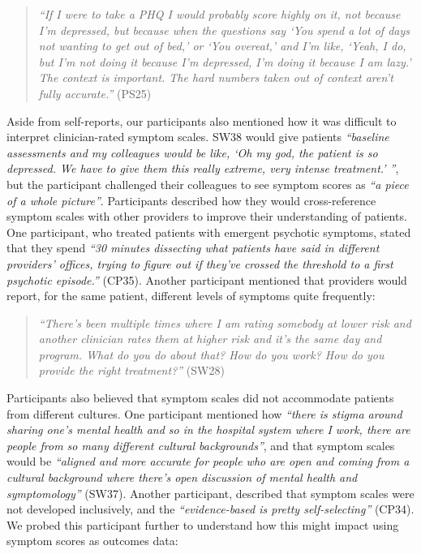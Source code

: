 \begin{quote}
    \textit{``If I were to take a PHQ I would probably score highly on it, not because I'm depressed, but because when the questions say `You spend a lot of days not wanting to get out of bed,' or `You overeat,' and I'm like, `Yeah, I do, but I'm not doing it because I'm depressed, I'm doing it because I am lazy.' 
    The context is important.
    The hard numbers taken out of context aren't fully accurate.''} (PS25)
\end{quote}

Aside from self-reports, our participants also mentioned how it was difficult to interpret clinician-rated symptom scales.
SW38 would give patients \textit{``baseline assessments and my colleagues would be like, `Oh my god, the patient is so depressed. We have to give them this really extreme, very intense treatment.' ''}, but the participant challenged their colleagues to see symptom scores as \textit{``a piece of a whole picture''}.
Participants described how they would cross-reference symptom scales with other providers to improve their understanding of patients.
One participant, who treated patients with emergent psychotic symptoms, stated that they spend \textit{``30 minutes dissecting what patients have said in different providers' offices, trying to figure out if they've crossed the threshold to a first psychotic episode.''} (CP35).
Another participant mentioned that providers would report, for the same patient, different levels of symptoms quite frequently:

\begin{quote}
    \textit{ ``There's been multiple times where I am rating somebody at lower risk and another clinician rates them at higher risk and it's the same day and program. What do you do about that? How do you work? How do you provide the right treatment?''} (SW28)
 \end{quote}

Participants also believed that symptom scales did not accommodate patients from different cultures.
One participant mentioned how \textit{``there is stigma around sharing one's mental health and so in the hospital system where I work, there are people from so many different cultural backgrounds''}, and that symptom scales would be \textit{``aligned and more accurate for people who are open and coming from a cultural background where there's open discussion of mental health and symptomology''} (SW37).
Another participant, described that symptom scales were not developed inclusively, and the \textit{``evidence-based is pretty self-selecting''} (CP34).
We probed this participant further to understand how this might impact using symptom scores as outcomes data:

